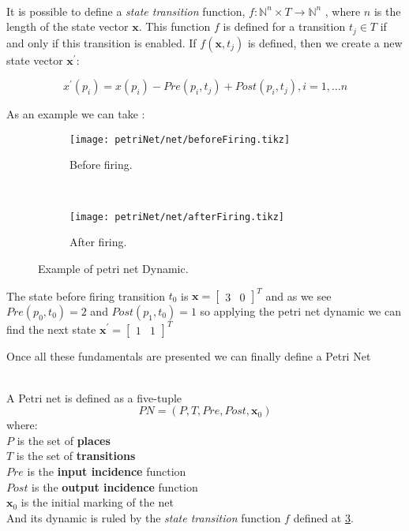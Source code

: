 \begin{definition}
  \label{def:petriNetDynamics}~\\
   It is possible to define a \emph{state transition}
  function, $f : \mathbb{N}^n \times T \rightarrow \mathbb{N}^n$  , where $n$ is
  the length of the state vector $\mathbf{x}$. This function $f$ is defined for
  a transition $t_j \in T$ if and only if this transition is enabled. If
  $f(\mathbf{x},t_j)$ is defined, then we create a new state vector
  $\mathbf{x}^\prime$:

  \[ x^\prime(p_i) = x(p_i) - Pre(p_i,t_j) + Post(p_i,t_j), i=1,\dots n \]
\end{definition}
  
As an example we can take :
\begin{figure}[H]
  \centering
 \begin{subfigure}[t]{0.45\textwidth}
  \centering
  \texttt{[image: petriNet/net/beforeFiring.tikz]}
  \caption{Before firing.}
  \label{fig:beforeFiring}
\end{subfigure}
~
\begin{subfigure}[t]{0.45\textwidth}
  \centering
  \texttt{[image: petriNet/net/afterFiring.tikz]}
  \caption{After firing.}
  \label{fig:afterFiring}
\end{subfigure}
  \caption{Example of petri net Dynamic.}
  \label{fig:petriNetDynamics}
\end{figure}
The state before firing transition $t_0$ is $\mathbf{x}=\begin{bmatrix}3&
  0\end{bmatrix}^T$ and as we see $Pre(p_0,t_0)=2$ and $Post(p_1,t_0)=1$ so
applying the petri net dynamic we can find the next state $\mathbf{x}^\prime=\begin{bmatrix}1&
  1\end{bmatrix}^T$

Once all these fundamentals are presented we can finally define a Petri Net

\begin{definition}
  \label{def:petriNet}~\\
  A Petri net is defined as a five-tuple
  \[PN = (P,T,Pre,Post,\mathbf{x}_0)\]
  where: \\
  \indent $P$ is the set of \textbf{places} \\
  \indent $T$ is the set of \textbf{transitions} \\
  \indent $Pre$ is the \textbf{input incidence} function  \\
  \indent $Post$ is the \textbf{output incidence} function\\
\indent $\mathbf{x}_0$ is the initial marking of the net \\
And its dynamic is ruled by the \emph{state transition} function $f$ defined at \ref{fig:petriNetDynamics}.

\end{definition}

